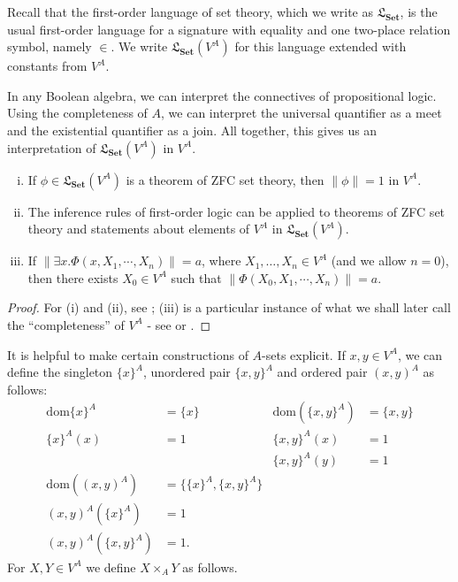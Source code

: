 \documentclass{lmcs}
\newcommand{\dom}{\ensuremath{\mathrm{dom}}}
\newcommand{\Set}{\cat{Set}}
\newcommand{\cat}[1]{\ensuremath{\mathbf{#1}}}
\newcommand{\Lang}{\mathfrak{L}}
\newcommand{\atimes}{\mathrel{\times_{\!A}}}
\begin{document}
Recall that the first-order language of set theory, which we write as $\Lang_\Set$, is the usual first-order language for a signature with equality and one two-place relation symbol, namely $\in$. We write $\Lang_\Set(V^A)$ for this language extended with constants from $V^A$. 

In any Boolean algebra, we can interpret the connectives of propositional logic. Using the completeness of $A$, we can interpret the universal quantifier as a meet and the existential quantifier as a join. All together, this gives us an interpretation of $\Lang_\Set(V^A)$ in $V^A$. 

\begin{thm}[$V^A$ as a model]
	\label{SetTheoryMetaTheorem}\hfill
	\begin{enumerate}[(i)]
		\item If $\phi \in \Lang_\Set(V^A)$ is a theorem of ZFC set theory, then $\| \phi \| = 1$ in $V^A$.
		\item The inference rules of first-order logic can be applied to theorems of ZFC set theory and statements about elements of $V^A$ in $\Lang_\Set(V^A)$. 
		\item If $\| \exists x. \Phi(x, X_1, \cdots, X_n) \|  = a$, where $X_1, \ldots, X_n \in V^A$ (and we allow $n = 0$), then there exists $X_0 \in V^A$ such that $\| \Phi(X_0, X_1, \cdots, X_n) \| = a$. 
	\end{enumerate}
\end{thm}
\begin{proof}
For (i) and (ii), see \cite[Theorem 1.17]{bell}; (iii) is a particular instance of what we shall later call the ``completeness'' of $V^A$ - see \cite[Lemma 14.19]{jech} or \cite[Lemma 1.27]{bell}. 
\end{proof}

It is helpful to make certain constructions of $A$-sets explicit. If $x,y \in V^A$, we can define the singleton $\{x\}^A$, unordered pair $\{ x,y \}^A$ and ordered pair $(x,y)^A$ as follows:
\begin{align*}
	\dom\{x\}^A &= \{ x \}  & \dom(\{x,y\}^A) &= \{ x, y\} \\
	\{x\}^A(x) &= 1 & \{x,y\}^A(x) &= 1 \\
	&     & \{x,y\}^A(y) &= 1 \\
	\dom((x,y)^A) &= \{ \{x\}^A, \{x,y\}^A \} \\
	(x,y)^A(\{x\}^A) &= 1 \\
	(x,y)^A(\{x,y\}^A) &= 1.
\end{align*}
For $X,Y \in V^A$ we define $X \atimes Y$ as follows.
\end{document}
